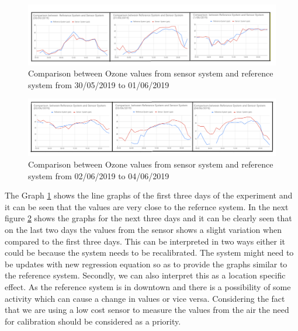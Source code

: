     
  \begin{figure}[h]
    \begin{center}
    \includegraphics[scale=0.70]{images/figure21.png}
    \end{center}
    \caption{Comparison between Ozone values from sensor system and reference system from 30/05/2019 to 01/06/2019}
    \label{Ozone}
    \bigskip



  \end{figure}
  \bigskip
  \begin{figure}[h]
    \begin{center}
    \includegraphics[scale=0.70]{images/figure22.png}
    \end{center}
    \caption{Comparison between Ozone values from sensor system and reference system from 02/06/2019 to 04/06/2019}
    \label{Ozone1}

  \end{figure}
  
The Graph \ref{Ozone} shows the line graphs of the first three days of the experiment and it can be seen that the values are very close to the refernce system. In the next figure \ref{Ozone1} shows the graphs for the next three days and it can be clearly seen that on the last two days the values from the sensor shows a slight variation when compared to the first three days. This can be interpreted in two ways either it could be because the system needs to be recalibrated. The system might need to be updates with new regression equation so as to provide the graphs similar to the reference system. Secondly, we can also interpret this as a location specific effect. As the reference system is in downtown and there is a possibility of some activity which can cause a change in values or vice versa. Considering the fact that we are using a low cost sensor to measure the values from the air the need for calibration should be considered as a priority. 







